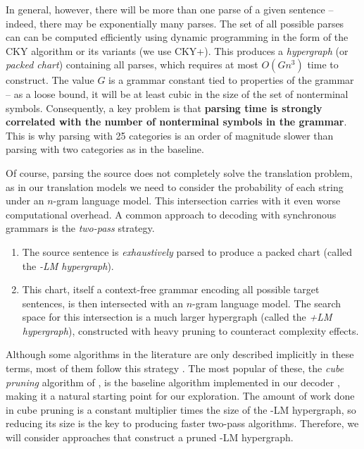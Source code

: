 In general, however, there will be more than one parse of a given sentence -- indeed, there may be exponentially many parses.  The set of all possible parses can can be computed efficiently using dynamic programming in the form of the CKY algorithm or its variants (we use CKY+).  This produces a {\it hypergraph} (or {\it packed chart}) containing all parses, which requires at most $O(Gn^3)$ time to construct.  The value $G$ is a grammar constant tied to properties of the grammar -- as a loose bound, it will be at least cubic in the size of the set of nonterminal symbols.  Consequently, a key problem is that {\bf parsing time is strongly correlated with the number of nonterminal symbols in the grammar}.  This is why parsing with 25 categories is an order of magnitude slower than parsing with two categories as in the baseline.

Of course, parsing the source does not completely solve the translation problem, as in our translation models we need to consider the probability of each string under an $n$-gram language model.  This intersection carries with it even worse computational overhead.  A common approach to decoding with synchronous grammars is the {\it two-pass} strategy.
\begin{enumerate}
	\item The source sentence is {\it exhaustively} parsed to produce a packed chart (called the {\it -LM hypergraph}).
	\item This chart, itself a context-free grammar encoding all possible target sentences, is then intersected with an $n$-gram language model.  The search space for this intersection is a much larger hypergraph (called the {\it +LM hypergraph}), constructed with heavy pruning to counteract complexity effects.
\end{enumerate}
Although some algorithms in the literature are only described implicitly in these terms, most of them follow this strategy \citep{Chiang2005,Huang+Chiang:2007:acl,venugopal-zollmann-stephan:2007:main,denero-EtAl:2009:NAACLHLT09,denero-pauls-klein:2009:Short,hopkins-langmead:2009:EMNLP,hopkins-langmead:2010:EMNLP,iglesias-EtAl:2009:NAACLHLT09}.  The most popular of these, the {\it cube pruning} algorithm of \citet{Chiang2005}, is the baseline algorithm implemented in our decoder \citep{dyer-EtAl:2010:Demos}, making it a natural starting point for our exploration.  The amount of work done in cube pruning is a constant multiplier times the size of the -LM hypergraph, so reducing its size is the key to producing faster two-pass algorithms.  Therefore, we will consider approaches that construct a pruned -LM hypergraph.

